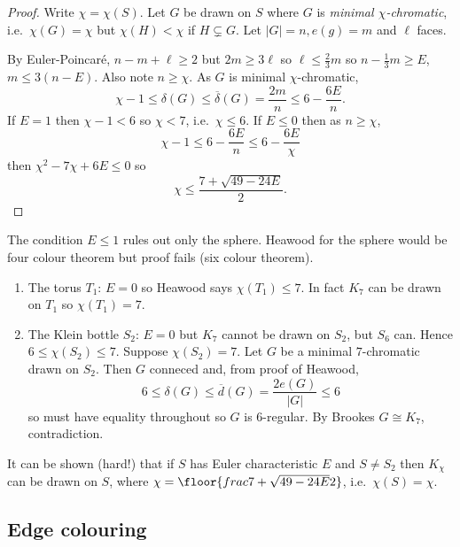 \documentclass[a4paper]{article}
\begin{document}
\begin{proof}
  Write \(\chi = \chi(S)\). Let \(G\) be drawn on \(S\) where \(G\) is \emph{minimal \(\chi\)-chromatic}, i.e.\ \(\chi(G) = \chi\) but \(\chi(H) < \chi\) if \(H \subsetneq G\). Let \(|G| = n, e(g) = m\) and \(\ell\) faces.

  By Euler-Poincaré, \(n - m + \ell \geq 2\) but \(2m \geq 3\ell\) so \(\ell \leq \frac{2}{3}m\) so \(n - \frac{1}{3}m \geq E\), \(m \leq 3(n - E)\). Also note \(n \geq \chi\). As \(G\) is minimal \(\chi\)-chromatic,
  \[
    \chi - 1 \leq \delta(G) \leq \overline \delta(G) = \frac{2m}{n} \leq 6 - \frac{6E}{n}.
  \]
  If \(E = 1\) then \(\chi - 1 < 6\) so \(\chi < 7\), i.e.\ \(\chi \leq 6\). If \(E \leq 0\) then as \(n \geq \chi\),
  \[
    \chi - 1 \leq 6 - \frac{6E}{n} \leq 6 - \frac{6E}{\chi}
  \]
  then \(\chi^2 - 7\chi + 6E \leq 0\) so
  \[
    \chi \leq \frac{7 + \sqrt{49 - 24E}}{2}.
  \]
\end{proof}

\begin{remark}
  The condition \(E \leq 1\) rules out only the sphere. Heawood for the sphere would be four colour theorem but proof fails (six colour theorem).
\end{remark}

\begin{eg}\leavevmode
  \begin{enumerate}
  \item The torus \(T_1\): \(E = 0\) so Heawood says \(\chi(T_1) \leq 7\). In fact \(K_7\) can be drawn on \(T_1\) so \(\chi(T_1) = 7\).
  \item The Klein bottle \(S_2\): \(E = 0\) but \(K_7\) cannot be drawn on \(S_2\), but \(S_6\) can. Hence \(6 \leq \chi(S_2) \leq 7\). Suppose \(\chi(S_2) = 7\). Let \(G\) be a minimal \(7\)-chromatic drawn on \(S_2\). Then \(G\) conneced and, from proof of Heawood,
    \[
      6 \leq \delta(G) \leq \overline d(G) = \frac{2e(G)}{|G|} \leq 6
    \]
    so must have equality throughout so \(G\) is \(6\)-regular. By Brookes \(G \cong K_7\), contradiction.
  \end{enumerate}
\end{eg}

It can be shown (hard!) that if \(S\) has Euler characteristic \(E\) and \(S \neq S_2\) then \(K_\chi\) can be drawn on \(S\), where \(\chi = \floor{frac{7 + \sqrt{49 - 24E}}{2}}\), i.e.\ \(\chi(S) = \chi\).

\subsection{Edge colouring}
\end{document}
